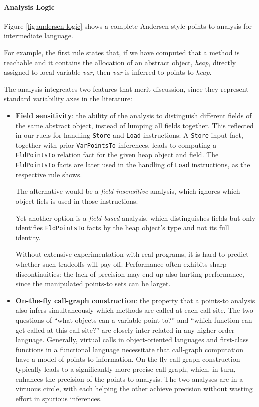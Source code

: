 \paragraph{Analysis Logic}

Figure \ref{fig:andersen-logic} shows a complete Andersen-style
points-to analysis for intermediate language.

For example, the first rule states that, if we have computed that a
method is reachable and it contains the allocation of an abstract
object, \textit{heap}, directly assigned to local variable
\textit{var}, then \textit{var} is inferred to points to
\textit{heap}.

The analysis integreates two features that merit discussion, since
they represent standard variability axes in the literature:

\begin{itemize}
\item \textbf{Field sensitivity}: the ability of the analysis to
  distinguish different fields of the same abstract object, instead of
  lumping all fields together. This reflected in our ruels for
  handling \texttt{Store} and \texttt{Load} instructions: A
  \texttt{Store} input fact, together with prior \texttt{VarPointsTo}
  inferences, leads to computing a \texttt{FldPointsTo} relation fact
  for the given heap object and field. The \texttt{FldPointsTo} facts
  are later used in the handling of \texttt{Load} instructions, as the
  respective rule shows.

  The alternative would be a \textit{field-insensitive} analysis,
  which ignores which object fiels is used in those instructions.

  Yet another option is a \textit{field-based} analysis, which
  distinguishes fields but only identifies \texttt{FldPointsTo} facts
  by the heap object's type and not its full identity.

  Without extensive experimentation with real programs, it is hard to
  predict whether such tradeoffs will pay off. Performance often
  exhibits sharp discontinuities: the lack of precision may end up
  also hurting performance, since the manipulated points-to sets can
  be larget.

\item \textbf{On-the-fly call-graph construction}: the property that a
  points-to analysis also infers simultaneously which methods are
  called at each call-site. The two questions of ``what objects can a
  variable point to?'' and ``which function can get called at this
  call-site?'' are closely inter-related in any higher-order
  language. Generally, virtual calls in object-oriented languages and
  first-class functions in a functional language necessitate that
  call-graph computation have a model of points-to
  information. On-the-fly call-graph construction typically leads to a
  significantly more precise call-graph, which, in turn, enhances the
  precision of the points-to analysis. The two analyses are in a
  virtuous circle, with each helping the other achieve precision
  without wasting effort in spurious inferences.


\end{itemize}
